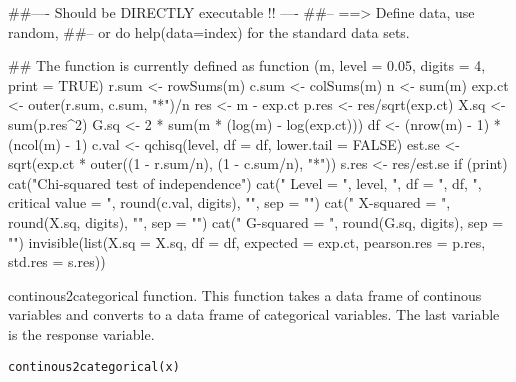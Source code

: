 \documentclass[letterpaper]{book}
\begin{document}
%
\begin{Examples}
\begin{ExampleCode}
##---- Should be DIRECTLY executable !! ----
##-- ==>  Define data, use random,
##--	or do  help(data=index)  for the standard data sets.

## The function is currently defined as
function (m, level = 0.05, digits = 4, print = TRUE) 
{
    r.sum <- rowSums(m)
    c.sum <- colSums(m)
    n <- sum(m)
    exp.ct <- outer(r.sum, c.sum, "*")/n
    res <- m - exp.ct
    p.res <- res/sqrt(exp.ct)
    X.sq <- sum(p.res^2)
    G.sq <- 2 * sum(m * (log(m) - log(exp.ct)))
    df <- (nrow(m) - 1) * (ncol(m) - 1)
    c.val <- qchisq(level, df = df, lower.tail = FALSE)
    est.se <- sqrt(exp.ct * outer((1 - r.sum/n), (1 - c.sum/n), 
        "*"))
    s.res <- res/est.se
    if (print) {
        cat("Chi-squared test of independence\n")
        cat("  Level = ", level, ", df = ", df, ", critical value = ", 
            round(c.val, digits), "\n", sep = "")
        cat("  X-squared = ", round(X.sq, digits), "\n", sep = "")
        cat("  G-squared = ", round(G.sq, digits), sep = "")
    }
    invisible(list(X.sq = X.sq, df = df, expected = exp.ct, pearson.res = p.res, 
        std.res = s.res))
  }
\end{ExampleCode}
\end{Examples}
%
\begin{Description}\relax

continous2categorical function. This function takes a data frame of continous variables and converts to a data frame of categorical variables. The last variable is the response variable.

\end{Description}
%
\begin{Usage}
\begin{verbatim}
continous2categorical(x)
\end{verbatim}
\end{Usage}
%
\begin{Arguments}
\begin{ldescription}
\item[\code{x}] 


\end{ldescription}
\end{Arguments}
%
\end{document}
